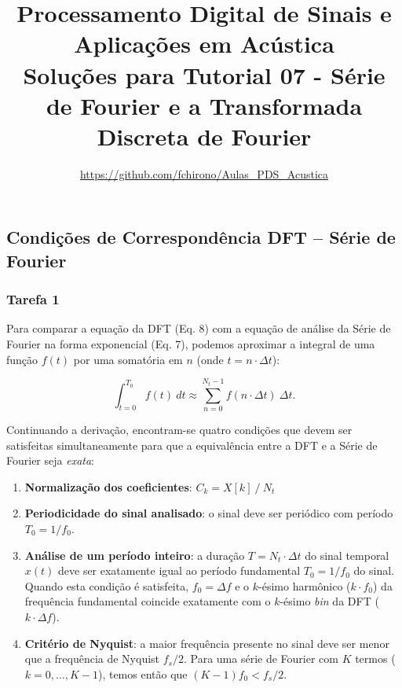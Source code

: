 \documentclass[a4paper,twoside,12pt]{article}
\title{\vspace{-2cm} Processamento Digital de Sinais e Aplicações em Acústica\\ Soluções para Tutorial 07 - Série de Fourier e a Transformada Discreta de Fourier}
\author{\url{https://github.com/fchirono/Aulas_PDS_Acustica}}
\begin{document}
	\date{}
	\maketitle

\setcounter{section}{2}
\subsection{Condições de Correspondência DFT -- Série de Fourier}

\subsubsection*{Tarefa 1}

Para comparar a equação da DFT (Eq. 8) com a equação de análise da Série de Fourier na forma exponencial (Eq. 7), podemos aproximar a integral de uma função $f(t)$ por uma somatória em $n$ (onde $t = n \cdot \Delta t$):

\begin{equation}
	\int_{t=0}^{T_0} f(t) \ dt \approx \sum_{n=0}^{N_t-1} f(n \cdot \Delta t) \ \Delta t.
\end{equation}

Continuando a derivação, encontram-se quatro condições que devem ser satisfeitas simultaneamente para que a equivalência entre a DFT e a Série de Fourier seja \emph{exata}:

\begin{enumerate}
	\item \textbf{Normalização dos coeficientes}: $C_k = X[k] \ / \ N_t$
	
	\item \textbf{Periodicidade do sinal analisado}: o sinal deve ser periódico com período $T_0 = 1/f_0$.
	
	\item \textbf{Análise de um período inteiro}: a duração $T = N_t \cdot \Delta t$ do sinal temporal $x(t)$ deve ser exatamente igual ao período fundamental $T_0 = 1/f_0$ do sinal. Quando esta condição é satisfeita, $f_0 = \Delta f$ e o $k$-ésimo harmônico ($k \cdot f_0$) da frequência fundamental coincide exatamente com o $k$-ésimo \emph{bin} da DFT ($k \cdot \Delta f$).
	
	\item \textbf{Critério de Nyquist}: a maior frequência presente no sinal deve ser menor que a frequência de Nyquist $f_s/2$. Para uma série de Fourier com $K$ termos ($k=0, \ldots, K-1$), temos então que $(K-1) f_0 < f_s/2$.
\end{enumerate}
\end{document}
